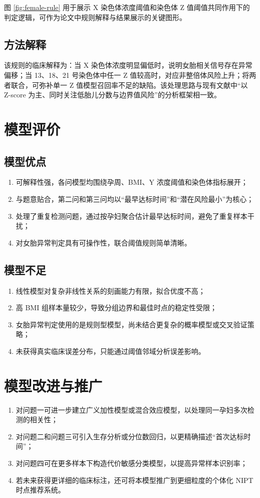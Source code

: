 ﻿\documentclass[12pt,a4paper]{article}
\begin{document}
图 \ref{fig:female-rule} 用于展示 X 染色体浓度阈值和染色体 Z 值阈值共同作用下的判定逻辑，可作为论文中规则解释与结果展示的关键图形。

\subsection{方法解释}
该规则的临床解释为：当 X 染色体浓度明显偏低时，说明女胎相关信号存在异常偏移；当 13、18、21 号染色体中任一 Z 值较高时，对应非整倍体风险上升；将两者联合，可弥补单一 Z 值模型召回率不足的缺陷。该处理思路与现有文献中“以 Z-score 为主、同时关注低胎儿分数与边界值风险”的分析框架相一致\cite{ref-wan2021,ref-demko2022,ref-acmg2023}。

\section{模型评价}
\subsection{模型优点}
\begin{enumerate}
    \item 可解释性强，各问模型均围绕孕周、BMI、Y 浓度阈值和染色体指标展开；
    \item 与题意贴合，第二问和第三问均以“最早达标时间”和“潜在风险最小”为核心；
    \item 处理了重复检测问题，通过按孕妇聚合估计最早达标时间，避免了重复样本干扰；
    \item 对女胎异常判定具有可操作性，联合阈值规则简单清晰。
\end{enumerate}

\subsection{模型不足}
\begin{enumerate}
    \item 线性模型对复杂非线性关系的刻画能力有限，拟合优度不高；
    \item 高 BMI 组样本量较少，导致分组边界和最佳时点的稳定性受限；
    \item 女胎异常判定使用的是规则型模型，尚未结合更复杂的概率模型或交叉验证策略；
    \item 未获得真实临床误差分布，只能通过阈值邻域分析误差影响。
\end{enumerate}

\section{模型改进与推广}
\begin{enumerate}
    \item 对问题一可进一步建立广义加性模型或混合效应模型，以处理同一孕妇多次检测的相关性；
    \item 对问题二和问题三可引入生存分析或分位数回归，以更精确描述“首次达标时间”；
    \item 对问题四可在更多样本下构造代价敏感分类模型，以提高异常样本识别率；
    \item 若未来获得更详细的临床标注，还可将本模型推广到更细粒度的个体化 NIPT 时点推荐系统。
\end{enumerate}
\end{document}
